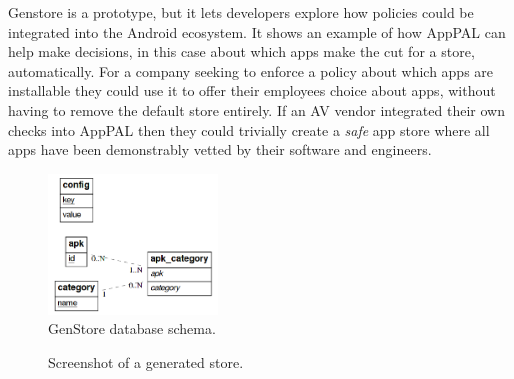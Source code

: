 \documentclass[thesis.tex]{subfiles}
\begin{document}
Genstore is a prototype, but it lets developers explore how policies could be integrated into the Android ecosystem.
It shows an example of how AppPAL can help make decisions, in this case about which apps make the cut for a store, automatically.
For a company seeking to enforce a policy about which apps are installable they could use it to offer their employees choice about apps, without having to remove the default store entirely.
If an AV vendor integrated their own checks into AppPAL then they could trivially create a \emph{safe} app store where all apps have been demonstrably vetted by their software and engineers.

\begin{figure}\centering
  \includegraphics[width=0.4\textwidth]{figures/genstore-schema.png}
  \caption{GenStore database schema.}
  \label{fig:genstore-schema}
\end{figure}

\begin{figure}\centering
  \caption{Screenshot of a generated store.}
  \label{fig:genstore-screenshot}
\end{figure}
\end{document}
